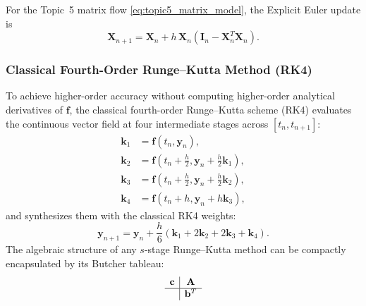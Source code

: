 \documentclass[11pt,a4paper]{article}
\theoremstyle{definition}
\theoremstyle{remark}
\begin{document}
For the Topic~5 matrix flow \eqref{eq:topic5_matrix_model}, the
Explicit Euler update is
\begin{equation}
\label{eq:topic5_explicit_euler}
\mathbf{X}_{n+1}
=
\mathbf{X}_n
+h\,\mathbf{X}_n
\left(\mathbf{I}_n-\mathbf{X}_n^T\mathbf{X}_n\right).
\end{equation}

\subsubsection{Classical Fourth-Order Runge--Kutta Method (RK4)}
To achieve higher-order accuracy without computing higher-order analytical derivatives of $\mathbf{f}$, the classical fourth-order Runge--Kutta scheme (RK4) evaluates the continuous vector field at four intermediate stages across $[t_n, t_{n+1}]$:
\begin{align}
\mathbf{k}_1 &= \mathbf{f}(t_n, \mathbf{y}_n), \label{eq:rk4_k1} \\
\mathbf{k}_2 &= \mathbf{f}\left(t_n + \frac{h}{2}, \mathbf{y}_n + \frac{h}{2}\mathbf{k}_1\right), \label{eq:rk4_k2} \\
\mathbf{k}_3 &= \mathbf{f}\left(t_n + \frac{h}{2}, \mathbf{y}_n + \frac{h}{2}\mathbf{k}_2\right), \label{eq:rk4_k3} \\
\mathbf{k}_4 &= \mathbf{f}(t_n + h, \mathbf{y}_n + h\mathbf{k}_3), \label{eq:rk4_k4}
\end{align}
and synthesizes them with the classical RK4 weights:
\begin{equation}
\label{eq:rk4_update}
\mathbf{y}_{n+1} = \mathbf{y}_n + \frac{h}{6} \left(\mathbf{k}_1 + 2\mathbf{k}_2 + 2\mathbf{k}_3 + \mathbf{k}_4\right).
\end{equation}
The algebraic structure of any $s$-stage Runge--Kutta method can be compactly encapsulated by its Butcher tableau:
\begin{equation}
\label{eq:butcher_general}
\begin{array}{c|c}
\mathbf{c} & \mathbf{A} \\
\hline
& \mathbf{b}^T
\end{array}
\end{equation}
\end{document}

